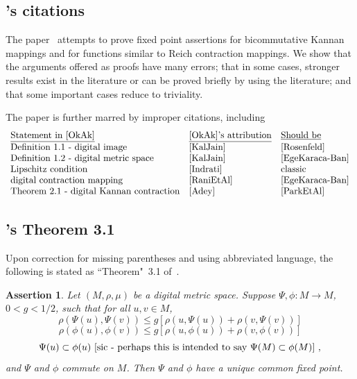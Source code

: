\documentclass{article}
\newtheorem{assert}[thm]{Assertion}
\numberwithin{thm}{section}
\begin{document}
\subsection{\cite{OkAk}'s citations}
The paper~\cite{OkAk} attempts to prove fixed point
assertions for bicommutative Kannan mappings and for 
functions similar to Reich contraction mappings.
We show that the arguments offered as proofs have many errors; that in some cases,
stronger results exist in the literature or can be proved
briefly by using the 
literature; and that some
important cases reduce 
to triviality.

The paper is further marred by improper citations, including
\[
\begin{array}{lll}
\mbox{\underline{Statement in~\cite{OkAk}}}     & 
\mbox{\underline{\cite{OkAk}'s attribution}} & 
\mbox{\underline{Should be}}  \\
     \mbox{Definition~1.1 - digital image} & \mbox{\cite{KalJain}} & \mbox{\cite{Rosenfeld}} \\
     \mbox{Definition~1.2 - digital metric space} & \mbox{\cite{KalJain}} & \mbox{\cite{EgeKaraca-Ban}} \\
     \mbox{Lipschitz condition} & \mbox{\cite{Indrati}} & \mbox{classic} \\
     \mbox{digital contraction mapping} & \mbox{\cite{RaniEtAl}} & 
     \mbox{\cite{EgeKaraca-Ban}} \\
     \mbox{Theorem~2.1 - digital Kannan contraction} & \mbox{\cite{Adey}} &
     \mbox{\cite{ParkEtAl}}
\end{array}
\]

\subsection{\cite{OkAk}'s Theorem 3.1}
Upon correction for missing parentheses and using abbreviated language,
the following is stated as ``Theorem"~3.1 of~\cite{OkAk}.

\begin{assert}
\label{OkAk3.1}
Let $(M, \rho, \mu)$ be a digital metric space. Suppose
$\Psi, \phi: M \to M$, $0 < g < 1/2$, such that for all
$u,v \in M$,
\begin{equation} 
\label{Kannen-Psi}
\rho(\Psi(u), \Psi(v)) \le g[\rho(u, \Psi(u)) + \rho(v, \Psi(v))]
\end{equation}
\begin{equation}
\label{Kannen-phi}
\rho(\phi(u), \phi(v)) \le g[\rho(u, \phi(u)) + \rho(v, \phi(v))]
\end{equation}
\[ \Psi(u) \subset \phi(u) \mbox{  {\rm [}sic - perhaps this is intended to say 
$\Psi(M) \subset \phi(M)${\rm ]} },
 \]
 and
 $\Psi$ and $\phi$ commute on $M$. Then $\Psi$ and $\phi$
 have a unique common fixed point.
\end{assert}
\end{document}
